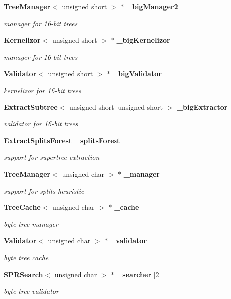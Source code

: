 \begin{CompactItemize}
{\bf Tree\-Manager}$<$ unsigned short $>$ $\ast$ {\bf \_\-big\-Manager2}
\begin{CompactList}\small\item\em manager for 16-bit trees \item\end{CompactList}\item 
{\bf Kernelizor}$<$ unsigned short $>$ $\ast$ {\bf \_\-big\-Kernelizor}
\begin{CompactList}\small\item\em manager for 16-bit trees \item\end{CompactList}\item 
{\bf Validator}$<$ unsigned short $>$ $\ast$ {\bf \_\-big\-Validator}
\begin{CompactList}\small\item\em kernelizor for 16-bit trees \item\end{CompactList}\item 
{\bf Extract\-Subtree}$<$ unsigned short, unsigned short $>$ {\bf \_\-big\-Extractor}
\begin{CompactList}\small\item\em validator for 16-bit trees \item\end{CompactList}\item 
{\bf Extract\-Splits\-Forest} {\bf \_\-splits\-Forest}
\begin{CompactList}\small\item\em support for supertree extraction \item\end{CompactList}\item 
{\bf Tree\-Manager}$<$ unsigned char $>$ $\ast$ {\bf \_\-manager}
\begin{CompactList}\small\item\em support for splits heuristic \item\end{CompactList}\item 
{\bf Tree\-Cache}$<$ unsigned char $>$ $\ast$ {\bf \_\-cache}
\begin{CompactList}\small\item\em byte tree manager \item\end{CompactList}\item 
{\bf Validator}$<$ unsigned char $>$ $\ast$ {\bf \_\-validator}
\begin{CompactList}\small\item\em byte tree cache \item\end{CompactList}\item 
{\bf SPRSearch}$<$ unsigned char $>$ $\ast$ {\bf \_\-searcher} [2]
\begin{CompactList}\small\item\em byte tree validator \item\end{CompactList}\end{CompactItemize}


